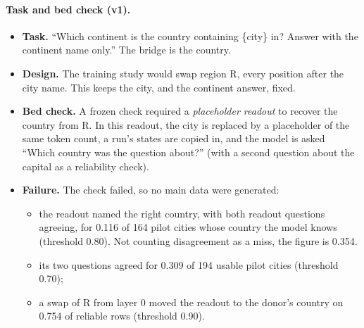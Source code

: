 \documentclass[11pt]{article}
\begin{document}
\paragraph{Task and bed check (v1).}
\begin{itemize}
\item \textbf{Task.} ``Which continent is the country containing \{city\} in? Answer with the continent name only.'' The bridge is the country.
\item \textbf{Design.} The training study would swap region R, every position after the city name. This keeps the city, and the continent answer, fixed.
\item \textbf{Bed check.} A frozen check required a \emph{placeholder readout} to recover the country from R. In this readout, the city is replaced by a placeholder of the same token count, a run's states are copied in, and the model is asked ``Which country was the question about?'' (with a second question about the capital as a reliability check).
\item \textbf{Failure.} The check failed, so no main data were generated:
  \begin{itemize}
  \item the readout named the right country, with both readout questions agreeing, for 0.116 of 164 pilot cities whose country the model knows (threshold 0.80). Not counting disagreement as a miss, the figure is 0.354.
  \item its two questions agreed for 0.309 of 194 usable pilot cities (threshold 0.70);
  \item a swap of R from layer 0 moved the readout to the donor's country on 0.754 of reliable rows (threshold 0.90).
  \end{itemize}
\end{itemize}
\end{document}
